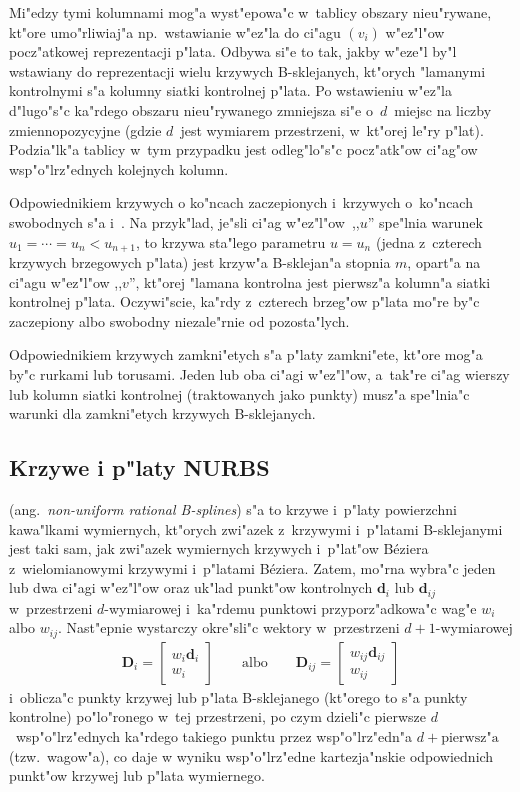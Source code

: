 Mi"edzy tymi kolumnami mog"a wyst"epowa"c
w~tablicy obszary nieu"rywane, kt"ore umo"rliwiaj"a np.\ wstawianie
w"ez"la do ci"agu $(v_i)$ w"ez"l"ow pocz"atkowej reprezentacji p"lata.
Odbywa si"e to tak, jakby w"eze"l by"l wstawiany do reprezentacji wielu
krzywych B-sklejanych, kt"orych "lamanymi kontrolnymi s"a kolumny siatki
kontrolnej p"lata. Po wstawieniu w"ez"la d"lugo"s"c ka"rdego obszaru
nieu"rywanego zmniejsza si"e o~$d$~miejsc na liczby zmiennopozycyjne (gdzie
$d$~jest wymiarem przestrzeni, w~kt"orej le"ry p"lat). Podzia"lk"a tablicy
w~tym przypadku jest odleg"lo"s"c pocz"atk"ow ci"ag"ow wsp"o"lrz"ednych
kolejnych kolumn.

Odpowiednikiem krzywych o ko"ncach zaczepionych i~krzywych o~ko"ncach
swobodnych s"a  i~.
Na przyk"lad, je"sli ci"ag w"ez"l"ow~,,$u$'' spe"lnia warunek
$u_1=\cdots=u_n<u_{n+1}$, to krzywa sta"lego parametru $u=u_n$ (jedna
z~czterech krzywych brzegowych p"lata) jest krzyw"a B-sklejan"a stopnia $m$,
opart"a na ci"agu w"ez"l"ow ,,$v$'', kt"orej "lamana kontrolna jest pierwsz"a
kolumn"a siatki kontrolnej p"lata. Oczywi"scie, ka"rdy z~czterech brzeg"ow
p"lata mo"re by"c zaczepiony albo swobodny niezale"rnie od pozosta"lych.

Odpowiednikiem krzywych zamkni"etych s"a p"laty zamkni"ete, kt"ore mog"a
by"c rurkami lub torusami. Jeden lub oba ci"agi w"ez"l"ow, a~tak"re ci"ag
wierszy lub kolumn siatki kontrolnej (traktowanych jako punkty) musz"a
spe"lnia"c warunki dla zamkni"etych krzywych B-sklejanych.


\subsection{Krzywe i p"laty NURBS}

 (ang.\ \textsl{non-uniform rational B-splines})
s"a to krzywe i~p"la\-ty powierzchni kawa"lkami wymiernych, kt"orych zwi"azek
z~krzywymi i~p"latami B-sklejanymi jest taki sam, jak zwi"azek wymiernych
krzywych i~p"lat"ow B\'{e}ziera z~wielomianowymi krzywymi i~p"latami
B\'{e}ziera. Zatem, mo"rna wybra"c jeden lub dwa ci"agi w"ez"l"ow oraz
uk"lad punkt"ow kontrolnych $\bm{d}_i$ lub $\bm{d}_{ij}$ w~przestrzeni
$d$-wymiarowej i~ka"rdemu punktowi przyporz"adkowa"c wag"e $w_i$ albo
$w_{ij}$. Nast"epnie wystarczy okre"sli"c wektory w~przestrzeni
$d+1$-wymiarowej
\begin{align}
  \bm{D}_i =
  \left[\begin{array}{c} w_i\bm{d}_i \\ w_i \end{array}\right]
  \qquad\mbox{albo}\qquad
  \bm{D}_{ij} =
  \left[\begin{array}{c} w_{ij}\bm{d}_{ij} \\ w_{ij} \end{array}\right]
\end{align}
i~oblicza"c punkty krzywej lub p"lata B-sklejanego (kt"orego to s"a punkty
kontrolne) po"lo"ronego w~tej przestrzeni, po czym dzieli"c pierwsze
$d$~wsp"o"lrz"ednych ka"rdego takiego punktu przez wsp"o"lrz"edn"a
$d+\mathord{\mbox{pierwsz"a}}$ (tzw.\ wagow"a), co daje w wyniku
wsp"o"lrz"edne kartezja"nskie odpowiednich punkt"ow krzywej lub p"lata
wymiernego.

